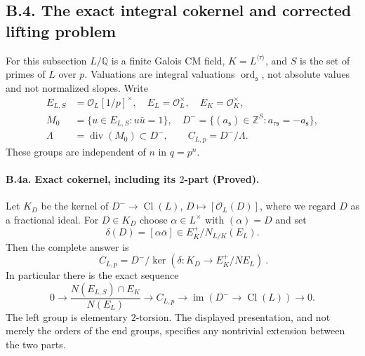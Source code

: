 \subsection{B.4. The exact integral cokernel and corrected lifting problem}

For this subsection $L/\mathbb Q$ is a finite Galois CM field,
$K=L^{\langle\tau\rangle}$, and $S$ is the set of primes of $L$ over
$p$. Valuations are integral valuations $\operatorname{ord}_{\mathfrak s}$,
not absolute values and not normalized slopes. Write
\[
 \begin{split}
 E_{L,S}&=\mathcal O_L[1/p]^\times,\quad E_L=\mathcal O_L^\times,
 \quad E_K=\mathcal O_K^\times,\\
 M_0&=\{u\in E_{L,S}:u\bar u=1\},\quad
 D^-=\{(a_{\mathfrak s})\in\mathbb Z^S:
 a_{\tau\mathfrak s}=-a_{\mathfrak s}\},\\
 \Lambda&=\operatorname{div}(M_0)\subset D^-,\qquad
 C_{L,p}=D^-/\Lambda.
 \end{split}
\]
These groups are independent of $n$ in $q=p^n$.

\paragraph{B.4a. Exact cokernel, including its $2$-part (Proved).}
\label{B4a}
Let $K_D$ be the kernel of
$D^-\to\operatorname{Cl}(L)$, $D\mapsto[\mathcal O_L(D)]$,
where we regard $D$ as a fractional ideal. For $D\in K_D$ choose
$\alpha\in L^\times$ with $(\alpha)=D$ and set
\[
 \delta(D)=[\alpha\bar\alpha]\in E_K^+/N_{L/K}(E_L).
\]
Then the complete answer is
\[
 \boxed{\ C_{L,p}=D^-/\ker(\delta:K_D\to E_K^+/N E_L)\ }.
\]
In particular there is the exact sequence
\[
 0\longrightarrow
 \frac{N(E_{L,S})\cap E_K}{N(E_L)}
 \longrightarrow C_{L,p}
 \longrightarrow\operatorname{im}(D^-\to\operatorname{Cl}(L))
 \longrightarrow0.
\]
The left group is elementary $2$-torsion. The displayed presentation,
and not merely the orders of the end groups, specifies any nontrivial
extension between the two parts.

